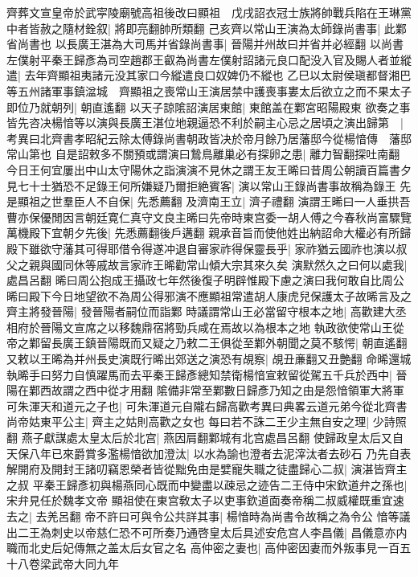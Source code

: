 齊葬文宣皇帝於武寜陵廟號高祖後改曰顯祖　戊戌詔衣冠士族將帥戰兵陷在王琳黨中者皆赦之隨材銓叙|{
	將即亮翻帥所類翻}
己亥齊以常山王演為太師錄尚書事|{
	此鄴省尚書也}
以長廣王湛為大司馬并省錄尚書事|{
	晉陽并州故曰并省并必經翻}
以尚書左僕射平秦王歸彥為司空趙郡王叡為尚書左僕射詔諸元良口配没入官及賜人者並縱遣|{
	去年齊顯祖夷諸元没其家口今縱遣良口奴婢仍不縱也}
乙巳以太尉侯瑱都督湘巴等五州諸軍事鎮湓城　齊顯祖之喪常山王演居禁中護喪事婁太后欲立之而不果太子即位乃就朝列|{
	朝直遙翻}
以天子諒隂詔演居東館|{
	東館盖在鄴宮昭陽殿東}
欲奏之事皆先咨决楊愔等以演與長廣王湛位地親逼恐不利於嗣主心忌之居頃之演出歸第　|{
	考異曰北齊書孝昭紀云除太傅錄尚書朝政皆决於帝月餘乃居藩邸今從楊愔傳　藩邸常山第也}
自是詔敕多不關預或謂演曰鷙鳥離巢必有探卵之患|{
	離力智翻探吐南翻}
今日王何宜屢出中山太守陽休之詣演演不見休之謂王友王晞曰昔周公朝讀百篇書夕見七十士猶恐不足錄王何所嫌疑乃爾拒絶賓客|{
	演以常山王錄尚書事故稱為錄王}
先是顯祖之世羣臣人不自保|{
	先悉薦翻}
及濟南王立|{
	濟子禮翻}
演謂王晞曰一人垂拱吾曹亦保優閒因言朝廷寛仁真守文良主晞曰先帝時東宫委一胡人傅之今春秋尚富驟覽萬機殿下宜朝夕先後|{
	先悉薦翻後戶遘翻}
親承音旨而使他姓出納詔命大權必有所歸殿下雖欲守藩其可得耶借令得遂冲退自審家祚得保靈長乎|{
	家祚猶云國祚也演以叔父之親與國同休等戚故言家祚王晞勸常山傾大宗其來久矣}
演默然久之曰何以處我|{
	處昌呂翻}
晞曰周公抱成王攝政七年然後復子明辟惟殿下慮之演曰我何敢自比周公晞曰殿下今日地望欲不為周公得邪演不應顯祖常遣胡人康虎兒保護太子故晞言及之齊主將發晉陽|{
	發晉陽者嗣位而詣鄴}
時議謂常山王必當留守根本之地|{
	高歡建大丞相府於晉陽文宣席之以移魏鼎宿將勁兵咸在焉故以為根本之地}
執政欲使常山王從帝之鄴留長廣王鎮晉陽既而又疑之乃敕二王俱從至鄴外朝聞之莫不駭愕|{
	朝直遙翻}
又敕以王晞為并州長史演既行晞出郊送之演恐有覘察|{
	覘丑亷翻又丑艶翻}
命晞還城執晞手曰努力自慎躍馬而去平秦王歸彥總知禁衛楊愔宣敕留從駕五千兵於西中|{
	晉陽在鄴西故謂之西中從才用翻}
隂備非常至鄴數日歸彥乃知之由是怨愔領軍大將軍可朱渾天和道元之子也|{
	可朱渾道元自隴右歸高歡考異曰典畧云道元弟今從北齊書}
尚帝姑東平公主|{
	齊主之姑則高歡之女也}
每曰若不誅二王少主無自安之理|{
	少詩照翻}
燕子獻謀處太皇太后於北宫|{
	燕因肩翻鄴城有北宫處昌呂翻}
使歸政皇太后又自天保八年已來爵賞多濫楊愔欲加澄汰|{
	以水為諭也澄者去泥滓汰者去砂石}
乃先自表解開府及開封王諸叨竊恩榮者皆從黜免由是嬖寵失職之徒盡歸心二叔|{
	演湛皆齊主之叔}
平秦王歸彥初與楊燕同心既而中變盡以疎忌之迹告二王侍中宋欽道弁之孫也|{
	宋弁見任於魏孝文帝}
顯祖使在東宫敎太子以吏事欽道面奏帝稱二叔威權既重宜速去之|{
	去羌呂翻}
帝不許曰可與令公共詳其事|{
	楊愔時為尚書令故稱之為令公}
愔等議出二王為刺史以帝慈仁恐不可所奏乃通啓皇太后具述安危宫人李昌儀|{
	昌儀意亦内職而北史后妃傳無之盖太后女官之名}
高仲密之妻也|{
	高仲密因妻而外叛事見一百五十八卷梁武帝大同九年}
